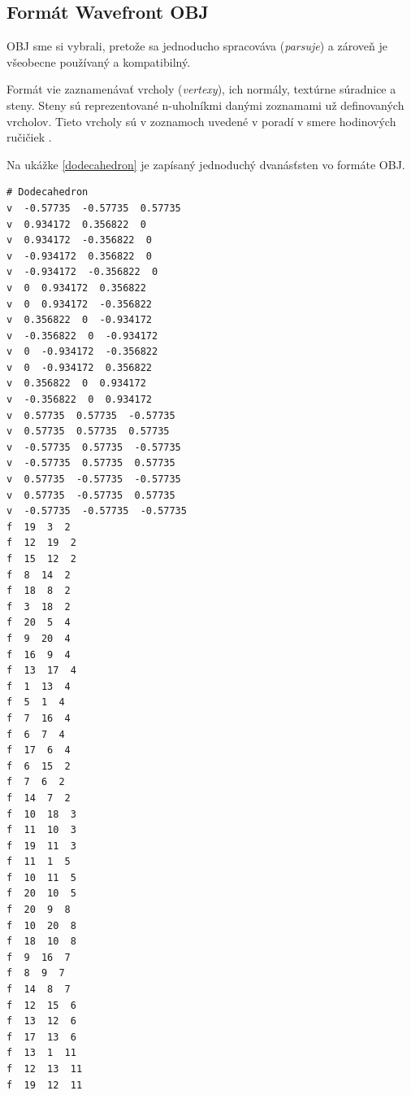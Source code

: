 \subsection{Formát Wavefront OBJ}

OBJ sme si vybrali, pretože sa jednoducho spracováva (\emph{parsuje}) a zároveň je všeobecne používaný a kompatibilný.

Formát vie zaznamenávať vrcholy (\emph{vertexy}), ich normály, textúrne súradnice a steny. Steny sú reprezentované n-uholníkmi danými zoznamami už definovaných vrcholov. Tieto vrcholy sú v zoznamoch uvedené v poradí v smere hodinových ručičiek \cite{Wavefront}.

Na ukážke \ref{dodecahedron} je zapísaný jednoduchý dvanásťsten vo formáte OBJ.


\begin{lstlisting}[label={dodecahedron}]
# Dodecahedron
v  -0.57735  -0.57735  0.57735
v  0.934172  0.356822  0
v  0.934172  -0.356822  0
v  -0.934172  0.356822  0
v  -0.934172  -0.356822  0
v  0  0.934172  0.356822
v  0  0.934172  -0.356822
v  0.356822  0  -0.934172
v  -0.356822  0  -0.934172
v  0  -0.934172  -0.356822
v  0  -0.934172  0.356822
v  0.356822  0  0.934172
v  -0.356822  0  0.934172
v  0.57735  0.57735  -0.57735
v  0.57735  0.57735  0.57735
v  -0.57735  0.57735  -0.57735
v  -0.57735  0.57735  0.57735
v  0.57735  -0.57735  -0.57735
v  0.57735  -0.57735  0.57735
v  -0.57735  -0.57735  -0.57735
f  19  3  2
f  12  19  2
f  15  12  2
f  8  14  2
f  18  8  2
f  3  18  2
f  20  5  4
f  9  20  4
f  16  9  4
f  13  17  4
f  1  13  4
f  5  1  4
f  7  16  4
f  6  7  4
f  17  6  4
f  6  15  2
f  7  6  2
f  14  7  2
f  10  18  3
f  11  10  3
f  19  11  3
f  11  1  5
f  10  11  5
f  20  10  5
f  20  9  8
f  10  20  8
f  18  10  8
f  9  16  7
f  8  9  7
f  14  8  7
f  12  15  6
f  13  12  6
f  17  13  6
f  13  1  11
f  12  13  11
f  19  12  11
\end{lstlisting}

